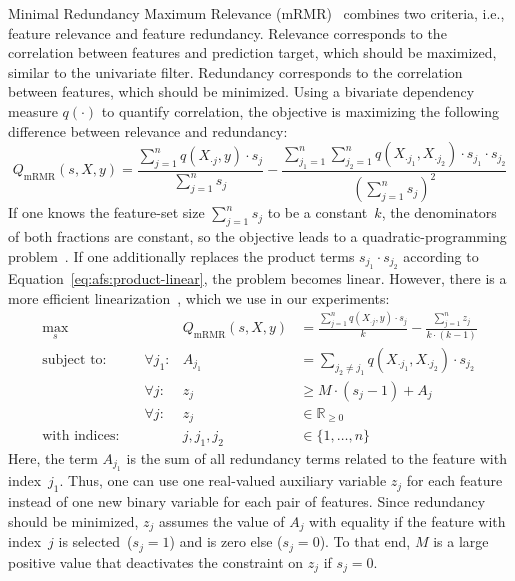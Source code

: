 \documentclass{article}
\theoremstyle{definition}
\begin{document}
Minimal Redundancy Maximum Relevance (mRMR)~\cite{peng2005feature} combines two criteria, i.e., feature relevance and feature redundancy.
Relevance corresponds to the correlation between features and prediction target, which should be maximized, similar to the univariate filter.
Redundancy corresponds to the correlation between features, which should be minimized.
Using a bivariate dependency measure $q(\cdot)$ to quantify correlation, the objective is maximizing the following difference between relevance and redundancy:
%
\begin{equation}
	Q_{\text{mRMR}}(s,X,y) = \frac{\sum_{j=1}^{n} q(X_{\cdot{}j},y) \cdot s_j}{\sum_{j=1}^{n} s_j} - \frac{\sum_{j_1=1}^{n} \sum_{j_2=1}^{n} q(X_{\cdot{}j_1}, X_{\cdot{}j_2}) \cdot s_{j_1} \cdot s_{j_2}}{(\sum_{j=1}^{n} s_j)^2}
	\label{eq:afs:mrmr}
\end{equation}
%
If one knows the feature-set size $\sum_{j=1}^{n} s_j$ to be a constant~$k$, the denominators of both fractions are constant, so the objective leads to a quadratic-programming problem~\cite{nguyen2014effective, rodriguez2010quadratic}.
If one additionally replaces the product terms $s_{j_1} \cdot s_{j_2}$ according to Equation~\ref{eq:afs:product-linear}, the problem becomes linear.
However, there is a more efficient linearization~\cite{nguyen2009optimizing, nguyen2010towards}, which we use in our experiments:
%
\begin{equation}
	\begin{aligned}
		\max_s &\quad & Q_{\text{mRMR}}(s,X,y) &= \frac{\sum_{j=1}^{n} q(X_{\cdot{}j},y) \cdot s_j}{k} - \frac{\sum_{j=1}^{n} z_j}{k \cdot (k-1)} \\
		\text{subject to:} &\quad \forall j_1: & A_{j_1} &= \sum_{j_2 \neq j_1} q(X_{\cdot{}j_1}, X_{\cdot{}j_2}) \cdot s_{j_2} \\
		&\quad \forall j: & z_j &\geq M \cdot (s_j - 1) + A_j \\
		&\quad \forall j: & z_j &\in \mathbb{R}_{\geq 0} \\
		\text{with indices:} &\quad & j, j_1, j_2 &\in \{1, \dots, n\}
	\end{aligned}
	\label{eq:afs:mrmr-linear}
\end{equation}
%
Here, the term $A_{j_1}$ is the sum of all redundancy terms related to the feature with index~$j_1$.
Thus, one can use one real-valued auxiliary variable $z_j$ for each feature instead of one new binary variable for each pair of features.
Since redundancy should be minimized, $z_j$ assumes the value of $A_j$ with equality if the feature with index~$j$ is selected~($s_j=1$) and is zero else ($s_j=0$).
To that end, $M$ is a large positive value that deactivates the constraint on $z_j$ if $s_j=0$.
\end{document}
